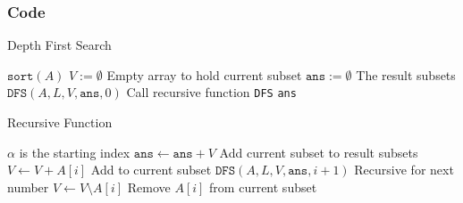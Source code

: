 \subsubsection{Code}
\setcounter{algorithm}{0}
\begin{algorithm}[H]
\caption{Depth First Search}
\begin{algorithmic}[1]
\State $\texttt{sort}(A)$
\State $V:=\emptyset$ \Comment Empty array to hold current subset
\State $\texttt{ans}:=\emptyset$ \Comment The result subsets
\State $\texttt{DFS}(A, L, V, \texttt{ans}, 0)$ \Comment Call recursive function \texttt{DFS}
\State \Return \texttt{ans}
\EndProcedure
\end{algorithmic}
\end{algorithm}

\begin{algorithm}[H]
\caption{Recursive Function}
\begin{algorithmic}[1]
 \Comment $\alpha$ is the starting index
\State $\texttt{ans}\gets \texttt{ans} + V$ \Comment Add current subset to result subsets
\State $V\gets V + A[i]$ \Comment Add to current subset
\State $\texttt{DFS}(A, L, V, \texttt{ans}, i+1)$ \Comment Recursive for next number
\State $V\gets V\setminus A[i]$ \Comment Remove $A[i]$ from current subset
\EndFor
\EndFunction
\end{algorithmic}
\end{algorithm}